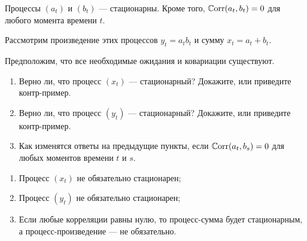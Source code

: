 \begin{problem}
  Процессы $(a_t)$ и $(b_t)$ — стационарны. 
  Кроме того, $\operatorname{\mathbb{C}\mathrm{orr}}(a_t, b_t) = 0$ для любого момента времени $t$. 
  
  Рассмотрим произведение этих процессов $y_t = a_t b_t$ и сумму $x_t = a_t + b_t$.

  Предположим, что все необходимые ожидания и ковариации существуют. 

  \begin{enumerate}
    \item Верно ли, что процесс $(x_t)$ — стационарный? Докажите, или приведите контр-пример.
    \item Верно ли, что процесс $(y_t)$ — стационарный? Докажите, или приведите контр-пример.
    \item Как изменятся ответы на предыдущие пункты, если $\operatorname{\mathbb{C}\mathrm{orr}}(a_t, b_s) = 0$ для любых моментов времени $t$ и $s$.
  \end{enumerate}
\begin{sol}
\begin{enumerate}
  \item Процесс $(x_t)$ не обязательно стационарен;
\item Процесс $(y_t)$ не обязательно стационарен;
\item Если любые корреляции равны нулю, то процесс-сумма будет стационарным, а процесс-произведение — не обязательно. 
\end{enumerate}
\end{sol}
\end{problem}